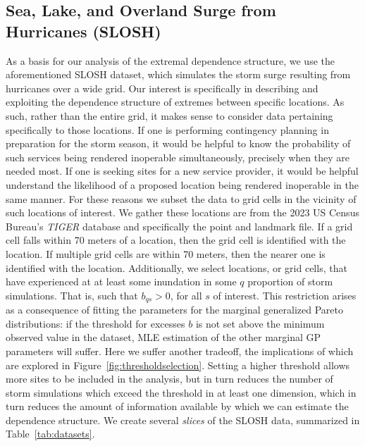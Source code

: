 \subsection{Sea, Lake, and Overland Surge from Hurricanes (SLOSH)}
As a basis for our analysis of the extremal dependence structure, we use the aforementioned
    SLOSH dataset, which simulates the storm surge resulting from hurricanes over a wide
    grid.  Our interest is specifically in describing and exploiting the dependence structure 
    of extremes between specific locations.  As such, rather than the entire grid, 
    it makes sense to consider data pertaining specifically to those locations. 
    If one is performing contingency planning in preparation for the storm season, 
    it would be helpful to know the probability of such services being rendered 
    inoperable simultaneously, precisely when they are needed most.  If one is 
    seeking sites for a new service provider, it would be helpful understand the 
    likelihood of a proposed location being rendered inoperable in the same 
    manner.  For these reasons we subset the data to grid cells in the 
    vicinity of such locations of interest.  We gather these locations are from 
    the 2023 US Census Bureau's \emph{TIGER} database \needcite and specifically 
    the point and landmark file.  If a grid cell falls within 70 meters of a location,
    then the grid cell is identified with the location.  If multiple grid cells
    are within 70 meters, then the nearer one is identified with the location.
    Additionally, we select locations, or grid cells, that have experienced at
    at least some inundation in some $q$ proportion of storm simulations.  That is,
    such that $b_{qs} > 0$, for all $s$ of interest.  This restriction arises
    as a consequence of fitting the parameters for the marginal generalized Pareto
    distributions: if the threshold for excesses $b$ is not set above the minimum observed
    value in the dataset, MLE estimation of the other marginal GP parameters will suffer.
    Here we suffer another tradeoff, the implications of which are explored in 
    Figure~\ref{fig:thresholdselection}.  Setting a higher threshold allows more 
    sites to be included in the analysis, but in turn reduces the number of storm 
    simulations which exceed the threshold in at least one dimension, which in turn 
    reduces the amount of information available by which we can estimate the 
    dependence structure.  We create several \emph{slices} of the SLOSH data,
    summarized in Table~\ref{tab:datasets}.

